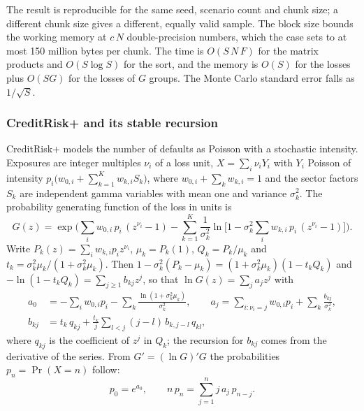 The result is reproducible for the same seed, scenario count and chunk size; a different chunk size gives a different, equally valid
sample. The block size bounds the working memory at $c\,N$ double-precision numbers, which the case sets to at most 150 million bytes per
chunk. The time is $O(S\,N\,F)$ for the matrix products and $O(S\log S)$ for the sort, and the memory is $O(S)$ for the losses plus
$O(SG)$ for the losses of $G$ groups. The Monte Carlo standard error falls as $1/\sqrt S$.

\subsubsection{CreditRisk+ and its stable recursion}

CreditRisk+ models the number of defaults as Poisson with a stochastic intensity. Exposures are integer multiples $\nu_i$ of a loss unit,
$X=\sum_i\nu_iY_i$ with $Y_i$ Poisson of intensity $p_i\big(w_{0,i}+\sum_{k=1}^{K}w_{k,i}S_k\big)$, where $w_{0,i}+\sum_kw_{k,i}=1$ and
the sector factors $S_k$ are independent gamma variables with mean one and variance $\sigma_k^2$. The probability generating function of
the loss in units is \citep{credit-capital:haaf2004}
\begin{equation}
G(z)=\exp\!\Bigg(\sum_{i}w_{0,i}\,p_i\,(z^{\nu_i}-1)-\sum_{k=1}^{K}\frac{1}{\sigma_k^2}\ln\Big[1-\sigma_k^2\sum_{i}w_{k,i}\,p_i\,(z^{\nu_i}-1)\Big]\Bigg).
\label{eq:cc-pgf}
\end{equation}
Write $P_k(z)=\sum_iw_{k,i}p_iz^{\nu_i}$, $\mu_k=P_k(1)$, $Q_k=P_k/\mu_k$ and $t_k=\sigma_k^2\mu_k/(1+\sigma_k^2\mu_k)$. Then
$1-\sigma_k^2(P_k-\mu_k)=(1+\sigma_k^2\mu_k)(1-t_kQ_k)$ and $-\ln(1-t_kQ_k)=\sum_{j\ge1}b_{kj}z^j$, so that $\ln G(z)=\sum_ja_jz^j$ with
\begin{equation}
\begin{aligned}
a_0&=-\sum_iw_{0,i}p_i-\sum_k\frac{\ln(1+\sigma_k^2\mu_k)}{\sigma_k^2},\qquad
a_j=\sum_{i:\nu_i=j}w_{0,i}p_i+\sum_k\frac{b_{kj}}{\sigma_k^2},\\
b_{kj}&=t_k\,q_{kj}+\frac{t_k}{j}\sum_{l<j}(j-l)\,b_{k,j-l}\,q_{kl},
\end{aligned}
\label{eq:cc-crp-coefficients}
\end{equation}
where $q_{kj}$ is the coefficient of $z^j$ in $Q_k$; the recursion for $b_{kj}$ comes from the derivative of the series. From
$G'=(\ln G)'G$ the probabilities $p_n=\Pr(X=n)$ follow:
\begin{equation}
p_0=e^{a_0},\qquad n\,p_n=\sum_{j=1}^{n}j\,a_j\,p_{n-j}.
\label{eq:cc-crp-recursion}
\end{equation}
